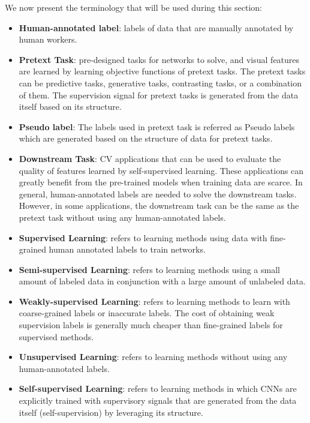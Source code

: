 We now present the terminology that will be used during this section:
\begin{itemize}
      \item \textbf{Human-annotated label}: labels of data that are manually annotated
            by human workers.
      \item \textbf{Pretext Task}: pre-designed tasks for networks to solve, and
            visual features are learned by learning objective functions of pretext
            tasks. The pretext tasks can be predictive tasks, generative tasks,
            contrasting tasks, or a combination of them. The supervision signal for
            pretext tasks is generated from the data itself based on its structure.
      \item \textbf{Pseudo label}: The labels used in pretext task is referred as
            Pseudo labels which are generated based on the structure of data for
            pretext tasks.
      \item \textbf{Downstream Task}: CV applications that can be used to evaluate
            the quality of features learned by self-supervised learning. These
            applications can greatly benefit from the pre-trained models when training
            data are scarce. In general, human-annotated labels are needed to solve
            the downstream tasks. However, in some applications, the downstream task
            can be the same as the pretext task without using any human-annotated
            labels.
      \item \textbf{Supervised Learning}: refers to learning methods using data with
            fine-grained human annotated labels to train networks.
      \item \textbf{Semi-supervised Learning}: refers to learning methods using a
            small amount of labeled data in conjunction with a large amount of
            unlabeled data.
      \item \textbf{Weakly-supervised Learning}: refers to learning methods to learn
            with coarse-grained labels or inaccurate labels. The cost of obtaining
            weak supervision labels is generally much cheaper than fine-grained
            labels for supervised methods.
      \item \textbf{Unsupervised Learning}: refers to learning methods without using
            any human-annotated labels.
      \item \textbf{Self-supervised Learning}: refers to learning methods in which
            CNNs are explicitly trained with supervisory signals that are generated
            from the data itself (self-supervision) by leveraging its structure.
\end{itemize}
